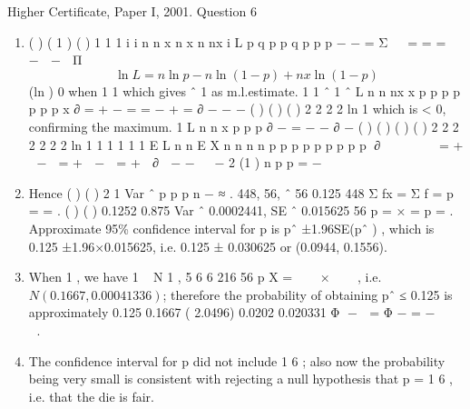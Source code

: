 \documentclass[a4paper,12pt]{article}
\begin{document}
Higher Certificate, Paper I, 2001. Question 6
\begin{enumerate}
\item ( ) ( 1 ) ( )
1
1
1
i i
n n
x n x n nx
i
L p q p p q p p
p
− −
=
Σ   = = =   −  −  Π
\[ \ln L = n \ln p − n\ln (1− p) + nx \ln(1− p)\]
(ln ) 0 when 1 1 which gives ˆ 1 as m.l.estimate.
1 1 ˆ 1 ˆ
L n n nx x p
p p p p p p x
∂ = + − = = − + =
∂ − − −
( ) ( )
( )
2
2 2 2
ln 1
which is < 0, confirming the maximum.
1
L n n x
p p p
∂ −
= − −
∂ −
( ) ( ) ( ) ( )
2
2 2 2 2 2 2
ln 1 1 1
1 1 1
E L n n E X n n n n
p p p p p p p p p
∂        = +  −  = +  −  = +  ∂  − −   −
2 (1 )
n
p p
=
−
\item Hence ( ) ( ) 2 1
Var ˆ
p p
p
n
−
≈ .
448, 56, ˆ 56 0.125
448
Σ fx = Σ f = p = = .
( ) ( )
0.1252 0.875 Var ˆ 0.0002441, SE ˆ 0.015625
56
p = × = p = .
Approximate 95\% confidence interval for p is pˆ ±1.96SE(pˆ ) , which is
0.125 ±1.96×0.015625, i.e. 0.125 ± 0.030625 or (0.0944, 0.1556).
\item When 1 , we have 1 ~ N 1 , 5
6 6 216 56
p
X
=    ×   
, i.e. $N(0.1667, 0.00041336)$; therefore
the probability of obtaining pˆ ≤ 0.125 is approximately
0.125 0.1667 ( 2.0496) 0.0202
0.020331
Φ −  = Φ − = −  
 
.
\item The confidence interval for p did not include 1
6
; also now the probability being very
small is consistent with rejecting a null hypothesis that p = 1
6
, i.e. that the die is fair.
\end{enumerate}
\end{document}
